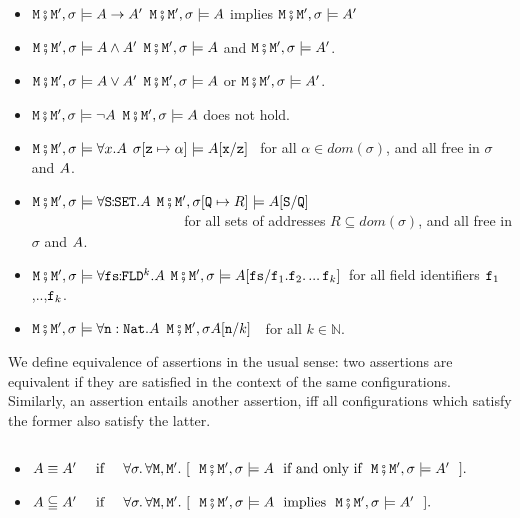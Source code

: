\begin{definition}
\begin{itemize}
\item
$\M\mkpair \M', \sigma \models \A \rightarrow \A' $ \IFF  $\M\mkpair \M', \sigma \models \A $ implies $\M\mkpair \M', \sigma \models \A' $
\item
$\M\mkpair \M', \sigma \models  \A \wedge \A'$   \IFF  $\M\mkpair \M', \sigma \models  \A $
and $\M\mkpair \M', \sigma \models  \A'$.
\item
$\M\mkpair \M', \sigma \models  \A \vee \A'$   \IFF  $\M\mkpair \M', \sigma \models  \A $
or $\M\mkpair \M', \sigma \models  \A'$.
\item
$\M\mkpair \M', \sigma \models  \neg\A$   \IFF  $\M\mkpair \M', \sigma \models  \A $
does not hold.
\item
$\M\mkpair \M', \sigma \models \forall x.\A$ \IFF
$\sigma[\prg{z}\mapsto \alpha] \models  \A[\prg{x}/\prg{z}]$ \ for all  $\alpha\in dom(\sigma)$, and   all  free in $\sigma$ and $\A$.\item
$\M\mkpair \M', \sigma \models \forall \prg{S}\!\!:\!\!\prg{SET}.\A$ \IFF  $\M\mkpair \M', \sigma[\prg{Q}\mapsto R] \models  \A[\prg{S}/\prg{Q}]$ \\
$\strut ~ \hspace{1.4in} $ for all sets of addresses $R\subseteq dom(\sigma)$, and  all  free in $\sigma$ and $\A$.

\item
$\M\mkpair \M', \sigma \models \forall \prg{fs}\!\!:\!\!\prg{FLD}^k.\A$ \IFF
$\M\mkpair \M', \sigma \models  \A[\prg{fs}/\prg{f}_1.\f_2.\,...\,\prg{f}_k]$\  for  all  field identifiers $\prg{f}_1$,..,$\prg{f}_k$.
\item
$\M\mkpair \M', \sigma \models  \forall \prg{n}:\prg{Nat}.\A$ \IFF  $\M\mkpair \M', \sigma \A[\prg{n}/k]$\ \ for all $k\in\mathbb{N}$.
\end{itemize}\end{definition}
 
We define equivalence of   assertions in the usual sense: two assertions are equivalent if they are satisfied  in
the context of the same configurations.
Similarly, an assertion entails another assertion, iff all configurations 
which satisfy the former also satisfy the latter.  

\begin{definition}
$ ~ $

\begin{itemize}
\item
$\A \equiv \A'\  \IFF\    \forall \sigma.\, \forall \M, \M'. \ [\ \ \M\mkpair \M', \sigma \models \A\ \mbox{ if and only if }\ \M\mkpair \M', \sigma \models \A'\ \ ].$
\item
$\A \subseteqq \A'\  \IFF\    \forall \sigma.\, \forall \M, \M'. \ [\ \ \M\mkpair \M', \sigma \models \A\ \mbox{ implies }\ \M\mkpair \M', \sigma \models \A'\ \ ].$
\end{itemize}
\end{definition}




